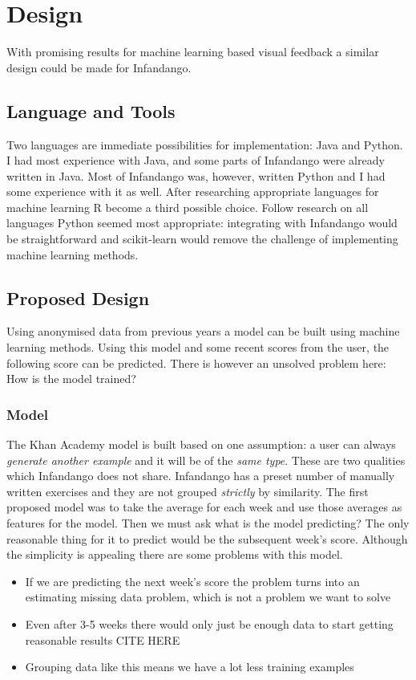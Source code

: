 \chapter{Design}
\label{design}
With promising results for machine learning based visual feedback a similar design could be made for Infandango.
\section{Language and Tools}
Two languages are immediate possibilities for implementation: Java\cite{java_site} and Python\cite{python_site}. I had most experience with Java, and some parts of Infandango were already written in Java. Most of Infandango was, however, written Python and I had some experience with it as well. After researching appropriate languages for machine learning R\cite{r_site} become a third possible choice. Follow research on all languages Python seemed most appropriate: integrating with Infandango would be straightforward and scikit-learn\cite{scikit_site} would remove the challenge of implementing machine learning methods.
\section{Proposed Design}
Using anonymised data from previous years a model can be built using machine learning methods. Using this model and some recent scores from the user, the following score can be predicted. There is however an unsolved problem here: How is the model trained?
\subsection{Model}
The Khan Academy model is built based on one assumption: a user can always \emph{generate another example} and it will be of the \emph{same type}. These are two qualities which Infandango does not share. Infandango has a preset number of manually written exercises and they are not grouped \emph{strictly} by similarity. The first proposed model was to take the average for each week and use those averages as features for the model. Then we must ask what is the model predicting? The only reasonable thing for it to predict would be the subsequent week's score. Although the simplicity is appealing there are some problems with this model. 

\begin{itemize}
\item If we are predicting the next week's score the problem turns into an estimating missing data problem, which is not a problem we want to solve
\item Even after 3-5 weeks there would only just be enough data to start getting reasonable results CITE HERE %
\item Grouping data like this means we have a lot less training examples
\end{itemize}

